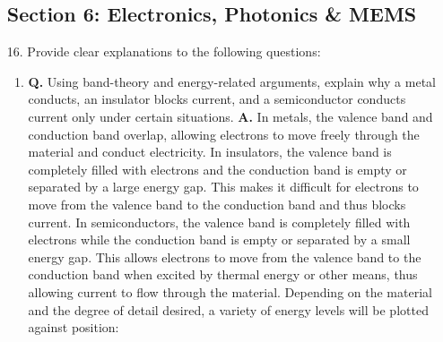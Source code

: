 \documentclass[main.tex]{subfiles}
\begin{document}
\begin{enumerate}

\subsection*{Section 6: Electronics, Photonics \& MEMS}

\item [16.] Provide clear explanations to the following questions:

    \begin{enumerate}
        \item \textbf{Q.} Using band-theory and energy-related arguments, explain why a metal conducts, an insulator blocks current, and a semiconductor conducts current only under certain situations. \textbf{A.} In metals, the valence band and conduction band overlap, allowing electrons to move freely through the material and conduct electricity. In insulators, the valence band is completely filled with electrons and the conduction band is empty or separated by a large energy gap. This makes it difficult for electrons to move from the valence band to the conduction band and thus blocks current. In semiconductors, the valence band is completely filled with electrons while the conduction band is empty or separated by a small energy gap. This allows electrons to move from the valence band to the conduction band when excited by thermal energy or other means, thus allowing current to flow through the material. Depending on the material and the degree of detail desired, a variety of energy levels will be plotted against position:
        

\end{enumerate}
\end{enumerate}
\end{document}
